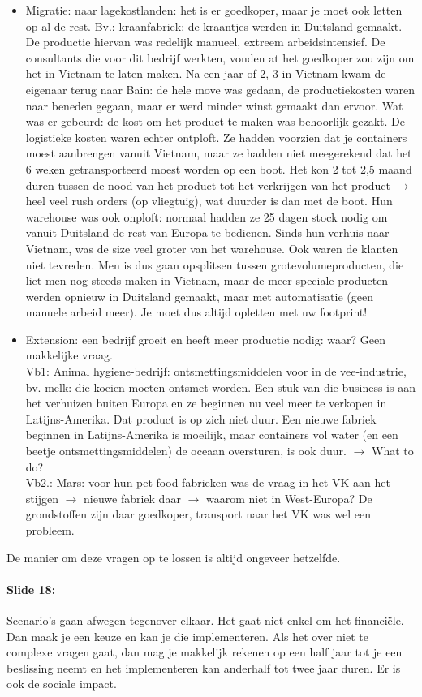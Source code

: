 \documentclass[10pt,a4paper]{report}
\begin{document}
\begin{itemize}
\item Migratie: naar lagekostlanden: het is er goedkoper, maar je moet ook letten op al de rest. Bv.: kraanfabriek: de kraantjes werden in Duitsland gemaakt. De productie hiervan was redelijk manueel, extreem arbeidsintensief. De consultants die voor dit bedrijf werkten, vonden at het goedkoper zou zijn om het in Vietnam te laten maken. Na een jaar of 2, 3 in Vietnam kwam de eigenaar terug naar Bain: de hele move was gedaan, de productiekosten waren naar beneden gegaan, maar er werd minder winst gemaakt dan ervoor. Wat was er gebeurd: de kost om het product te maken was behoorlijk gezakt. De logistieke kosten waren echter ontploft. Ze hadden voorzien dat je containers moest aanbrengen vanuit Vietnam, maar ze hadden niet meegerekend dat het 6 weken getransporteerd moest worden op een boot. Het kon 2 tot 2,5 maand duren tussen de nood van het product tot het verkrijgen van het product $\rightarrow$ heel veel rush orders (op vliegtuig), wat duurder is dan met de boot. Hun warehouse was ook onploft: normaal hadden ze 25 dagen stock nodig om vanuit Duitsland de rest van Europa te bedienen. Sinds hun verhuis naar Vietnam, was de size veel groter van het warehouse. Ook waren de klanten niet tevreden. Men is dus gaan opsplitsen tussen grotevolumeproducten, die liet men nog steeds maken in Vietnam, maar de meer speciale producten werden opnieuw in Duitsland gemaakt, maar met automatisatie (geen manuele arbeid meer). Je moet dus altijd opletten met uw footprint!
\item Extension: een bedrijf groeit en heeft meer productie nodig: waar? Geen makkelijke vraag.\\
Vb1: Animal hygiene-bedrijf: ontsmettingsmiddelen voor in de vee-industrie, bv. melk: die koeien moeten ontsmet worden. Een stuk van die business is aan het verhuizen buiten Europa en ze beginnen nu veel meer te verkopen in Latijns-Amerika. Dat product is op zich niet duur. Een nieuwe fabriek beginnen in Latijns-Amerika is moeilijk, maar containers vol water (en een beetje ontsmettingsmiddelen) de oceaan oversturen, is ook duur. $\rightarrow$ What to do? \\
Vb2.: Mars: voor hun pet food fabrieken was de vraag in het VK aan het stijgen $\rightarrow$ nieuwe fabriek daar $\rightarrow$ waarom niet in West-Europa? De grondstoffen zijn daar goedkoper, transport naar het VK was wel een probleem. 
\end{itemize}
De manier om deze vragen op te lossen is altijd ongeveer hetzelfde. 

\paragraph{Slide 18:} Scenario's gaan afwegen tegenover elkaar. Het gaat niet enkel om het financi\"ele. Dan maak je een keuze en kan je die implementeren. Als het over niet te complexe vragen gaat, dan mag je makkelijk rekenen op een half jaar tot je een beslissing neemt en het implementeren kan anderhalf tot twee jaar duren. Er is ook de sociale impact. 
\end{document}
